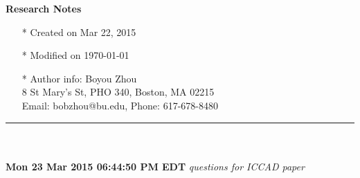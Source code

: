 \documentclass[]{article}
\begin{document}
\pagestyle{empty}
{\large\textbf{Research Notes}}
\begin{itemize}
    \item[*] Created on Mar 22, 2015
    \item[*] Modified on \today
    \item[*] Author info: Boyou Zhou\\
             8 St Mary's St, PHO 340, Boston, MA 02215\\
             Email: bobzhou@bu.edu, Phone: 617-678-8480
\end{itemize}


\rule[-0.1cm]{7.5in}{0.01cm}\\
\\

\noindent \textbf{Mon 23 Mar 2015 06:44:50 PM EDT}
\textit{questions for ICCAD paper}
\indent		\begin{itemize}


\end{itemize}
\end{document}
